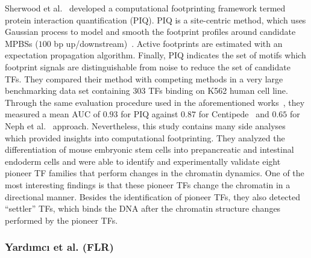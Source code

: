 Sherwood et al.~\cite{sherwood2014} developed a computational footprinting framework termed protein interaction quantification (PIQ). PIQ is a site-centric method, which uses Gaussian process to model and smooth the footprint profiles around candidate MPBSs ($100$ bp up/downstream)~\cite{sherwood2014}. Active footprints are estimated with an expectation propagation algorithm. Finally, PIQ indicates the set of motifs which footprint signals are distinguishable from noise to reduce the set of candidate TFs. They compared their method with competing methods in a very large benchmarking data set containing $303$ TFs binding on K562 human cell line. Through the same evaluation procedure used in the aforementioned works~\cite{pique2011,cuellar2012,piper2013}, they measured a mean AUC of $0.93$ for PIQ against $0.87$ for Centipede~\cite{pique2011} and $0.65$ for Neph et al.~\cite{neph2012a} approach. Nevertheless, this study contains many side analyses which provided insights into computational footprinting. They analyzed the differentiation of mouse embryonic stem cells into prepancreatic and intestinal endoderm cells and were able to identify and experimentally validate eight pioneer TF families that perform changes in the chromatin dynamics. One of the most interesting findings is that these pioneer TFs change the chromatin in a directional manner. Besides the identification of pioneer TFs, they also detected ``settler'' TFs, which binds the DNA after the chromatin structure changes performed by the pioneer TFs.

\subsubsection{Yard{\i}mc{\i} et al. (FLR)}
\label{sec:yardimci.2}

